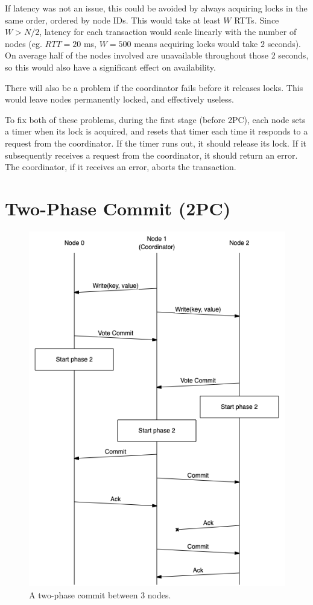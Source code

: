 \documentclass[12pt,a4paper,twoside,openany]{report}
\begin{document}
If latency was not an issue, this could be avoided by always acquiring locks in the same order, ordered by node IDs. This would take at least $W$ RTTs. Since $W > N / 2$, latency for each transaction would scale linearly with the number of nodes (eg. $RTT = 20$ ms, $W = 500$ means acquiring locks would take $2$ seconds). On average half of the nodes involved are unavailable throughout those 2 seconds, so this would also have a significant effect on availability.

There will also be a problem if the coordinator fails before it releases locks. This would leave nodes permanently locked, and effectively useless.

To fix both of these problems, during the first stage (before 2PC), each node sets a timer when its lock is acquired, and resets that timer each time it responds to a request from the coordinator. If the timer runs out, it should release its lock. If it subsequently receives a request from the coordinator, it should return an error. The coordinator, if it receives an error, aborts the transaction.

\section{Two-Phase Commit (2PC)}

\begin{figure}[ht!]
\centerline{\includegraphics[width=0.75\linewidth]{figs/2pc.png}}
\caption{A two-phase commit between 3 nodes.}
\label{2pc}
\end{figure}
\end{document}
